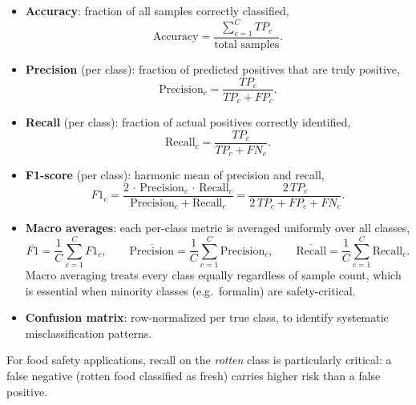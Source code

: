 \documentclass[12pt, a4paper]{article}
\begin{document}
\begin{itemize}
    \item \textbf{Accuracy}: fraction of all samples correctly classified,
    \begin{equation}
        \text{Accuracy} = \frac{\displaystyle\sum_{c=1}^{C} TP_c}{\text{total samples}}.
    \end{equation}

    \item \textbf{Precision} (per class): fraction of predicted positives that
    are truly positive,
    \begin{equation}
        \text{Precision}_c = \frac{TP_c}{TP_c + FP_c}.
    \end{equation}

    \item \textbf{Recall} (per class): fraction of actual positives correctly
    identified,
    \begin{equation}
        \text{Recall}_c = \frac{TP_c}{TP_c + FN_c}.
    \end{equation}

    \item \textbf{F1-score} (per class): harmonic mean of precision and recall,
    \begin{equation}
        F1_c = \frac{2\,\cdot\,\text{Precision}_c\,\cdot\,\text{Recall}_c}
                    {\text{Precision}_c + \text{Recall}_c}
             = \frac{2\,TP_c}{2\,TP_c + FP_c + FN_c}.
    \end{equation}

    \item \textbf{Macro averages}: each per-class metric is averaged uniformly
    over all classes,
    \begin{equation}
        \overline{F1} = \frac{1}{C}\sum_{c=1}^{C} F1_c,
        \qquad
        \overline{\text{Precision}} = \frac{1}{C}\sum_{c=1}^{C} \text{Precision}_c,
        \qquad
        \overline{\text{Recall}} = \frac{1}{C}\sum_{c=1}^{C} \text{Recall}_c.
    \end{equation}
    Macro averaging treats every class equally regardless of sample count,
    which is essential when minority classes (e.g.\ formalin) are
    safety-critical.

    \item \textbf{Confusion matrix}: row-normalized per true class, to identify
    systematic misclassification patterns.
\end{itemize}

For food safety applications, recall on the \textit{rotten} class is
particularly critical: a false negative (rotten food classified as fresh)
carries higher risk than a false positive.
\end{document}
